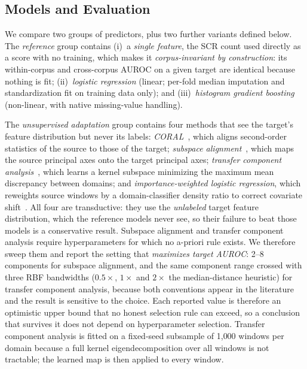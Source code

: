 \documentclass[healthcare,article,submit,moreauthors,pdftex]{Definitions/mdpi}
\begin{document}
\subsection{Models and Evaluation}

We compare two groups of predictors, plus two further variants defined below. The \emph{reference} group contains
(i)~a \emph{single feature}, the SCR count used directly as a score with no
training, which makes it \emph{corpus-invariant by construction}: its
within-corpus and cross-corpus AUROC on a given target are identical because
nothing is fit; (ii)~\emph{logistic regression} (linear; per-fold median
imputation and standardization fit on training data only); and
(iii)~\emph{histogram gradient boosting} (non-linear, with native missing-value
handling).

The \emph{unsupervised adaptation} group contains four methods that see the
target's feature distribution but never its labels:
\emph{CORAL}~\cite{sun2016coral}, which aligns second-order statistics of the
source to those of the target; \emph{subspace alignment}~\cite{fernando2013subspace},
which maps the source principal axes onto the target principal axes;
\emph{transfer component analysis}~\cite{pan2011tca}, which learns a kernel
subspace minimizing the maximum mean discrepancy between domains; and
\emph{importance-weighted logistic regression}, which reweights source windows by
a domain-classifier density ratio to correct covariate
shift~\cite{shimodaira2000covariateshift,sugiyama2008importance,bickel2009discriminative}. All four are
transductive: they use the \emph{unlabeled} target feature distribution, which
the reference models never see, so their failure to beat those models is a
conservative result. Subspace alignment and transfer component analysis require hyperparameters for
which no a-priori rule exists. We therefore sweep them and report the setting that
\emph{maximizes target AUROC}: 2--8 components for subspace alignment, and the
same component range crossed with three RBF bandwidths ($0.5\times$, $1\times$
and $2\times$ the median-distance heuristic) for transfer component analysis,
because both conventions appear in the literature and the result is sensitive to
the choice. Each reported value is therefore an optimistic upper bound that no
honest selection rule can exceed, so a conclusion that survives it does not depend
on hyperparameter selection.
Transfer component analysis is fitted on a fixed-seed subsample of 1{,}000
windows per domain because a full kernel eigendecomposition over all windows is
not tractable; the learned map is then applied to every window.
\end{document}

